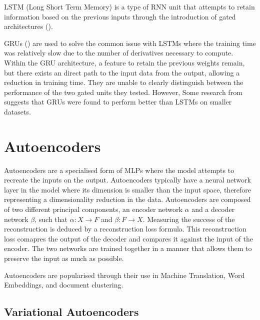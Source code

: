 \documentclass[12pt,twoside]{report}
\begin{document}
LSTM (Long Short Term Memory) is a type of RNN unit that attempts to retain information based on the previous inputs through the introduction of gated architectures (\cite{hochreiter_long_1997}).

GRUs (\cite{cho_properties_2014}) are used to solve the common issue with LSTMs where the training time was relatively slow due to the number of derivatives necessary to compute. Within the GRU architecture, a feature to retain the previous weights remain, but there exists an direct path to the input data from the output, allowing a reduction in training time. They are unable to clearly distinguish between the performance of the two gated units they tested.
However, Some research from \cite{chung_empirical_2014} suggests that GRUs were found to perform better than LSTMs on smaller datasets. 

\section{Autoencoders}

Autoencoders are a specialised form of MLPs where the model attempts to recreate the inputs on the output. Autoencoders typically have a neural network layer in the model where its dimension is smaller than the input space, therefore representing a dimensionality reduction in the data. Autoencoders are composed of two different principal components, an encoder network $\alpha$ and a decoder network $\beta$, such that $\alpha : X \rightarrow F$ and $\beta : F \rightarrow X$. Measuring the success of the reconstruction is deduced by a reconstruction loss formula. This reconstruction loss comapres the output of the decoder and compares it against the input of the encoder. The two networks are trained together in a manner that allows them to preserve the input as much as possible.

Autoencoders are popularised through their use in Machine Translation, Word Embeddings, and document clustering.

\subsection{Variational Autoencoders}
\end{document}
